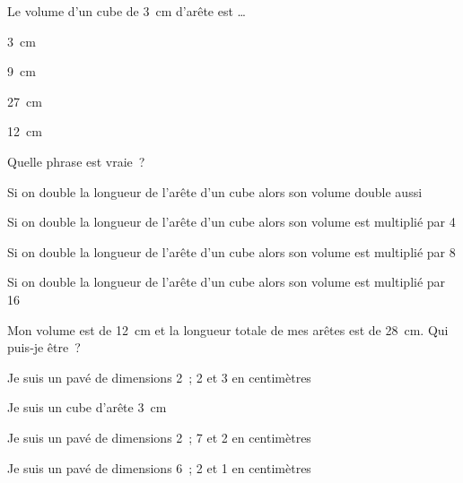     
\begin{QCM}
  \begin{GroupeQCM}
      
    \begin{exercice}
      Le volume d'un cube de 3 cm d'arête est \ldots
      \begin{ChoixQCM}{4}
      \item 3 cm
      \item 9 cm
      \item 27 cm
      \item 12 cm
      \end{ChoixQCM}
\begin{corrige}
   \end{corrige}
    \end{exercice}


    \begin{exercice}
      Quelle phrase est vraie ?
      \begin{ChoixQCM}{4}
      \item Si on double la longueur de l'arête d'un cube alors son volume double aussi
      \item Si on double la longueur de l'arête d'un cube alors son volume est multiplié par 4
      \item Si on double la longueur de l'arête d'un cube alors son volume est multiplié par 8
      \item Si on double la longueur de l'arête d'un cube alors son volume est multiplié par 16
      \end{ChoixQCM}
\begin{corrige}
   \end{corrige}
    \end{exercice}
    
    
    \begin{exercice}
      Mon volume est de 12 cm et la longueur totale de mes arêtes est de 28 cm. Qui puis‑je être ?
      \begin{ChoixQCM}{4}
      \item Je suis un pavé de dimensions  2 ; 2 et 3 en centimètres
      \item Je suis un cube d'arête 3 cm
      \item Je suis un pavé de dimensions 2 ; 7 et 2 en centimètres
      \item Je suis un pavé de dimensions  6 ; 2 et 1 en centimètres
      \end{ChoixQCM}
\begin{corrige}
   \end{corrige}
    \end{exercice}


\end{GroupeQCM}
\end{QCM}

  